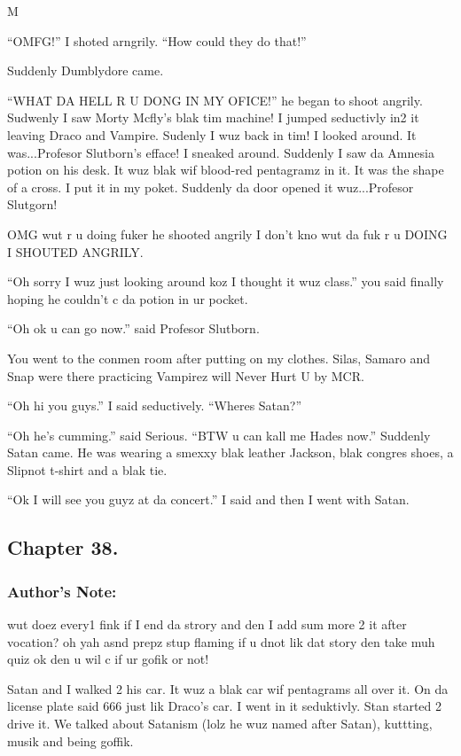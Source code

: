 M\documentclass{article}
\begin{document}
“OMFG!” I shoted arngrily. “How could they do that!”

Suddenly Dumblydore came.

“WHAT DA HELL R U DONG IN MY OFICE!” he began to shoot angrily. Sudwenly I saw Morty Mcfly’s blak tim machine! I jumped seductivly in2 it leaving Draco and Vampire. Sudenly I wuz back in tim! I looked around. It was...Profesor Slutborn’s efface! I sneaked around. Suddenly I saw da Amnesia potion on his desk. It wuz blak wif blood-red pentagramz in it. It was the shape of a cross. I put it in my poket. Suddenly da door opened it wuz...Profesor Slutgorn!

OMG wut r u doing fuker he shooted angrily I don’t kno wut da fuk r u DOING I SHOUTED ANGRILY.

“Oh sorry I wuz just looking around koz I thought it wuz class.” you said finally hoping he couldn’t c da potion in ur pocket.

“Oh ok u can go now.” said Profesor Slutborn.

You went to the conmen room after putting on my clothes. Silas, Samaro and Snap were there practicing Vampirez will Never Hurt U by MCR.

“Oh hi you guys.” I said seductively. “Wheres Satan?”

“Oh he’s cumming.” said Serious. “BTW u can kall me Hades now.” Suddenly Satan came. He was wearing a smexxy blak leather Jackson, blak congres shoes, a Slipnot t-shirt and a blak tie.

“Ok I will see you guyz at da concert.” I said and then I went with Satan.

\clearpage\nolinenumbers
\subsection*{Chapter 38.}

\subsubsection*{Author's Note: }wut doez every1 fink if I end da strory and den I add sum more 2 it after vocation? oh yah asnd prepz stup flaming if u dnot lik dat story den take muh quiz ok den u wil c if ur gofik or not!

\textbreak
\linenumbers\resetlinenumber

Satan and I walked 2 his car. It wuz a blak car wif pentagrams all over it. On da license plate said 666 just lik Draco’s car. I went in it seduktivly. Stan started 2 drive it. We talked about Satanism (lolz he wuz named after Satan), kuttting, musik and being goffik.
\end{document}
